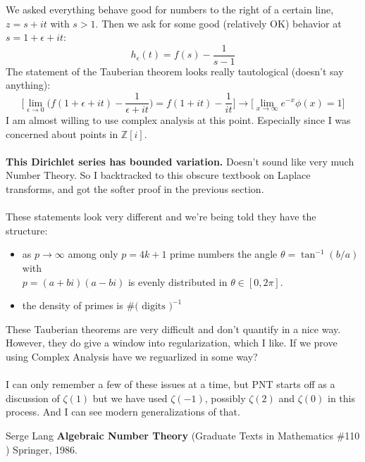 \documentclass[12pt]{article}
\begin{document}
\noindent We asked everything behave good for numbers to the right of a certain line, $z = s + it $ with $s > 1$.  Then we ask for some good (relatively OK)  behavior at $s = 1+\epsilon + it $:
$$ h_\epsilon(t) = f(s) - \frac{1}{s-1}  $$
The statement of the Tauberian theorem looks really tautological (doesn't say anything):
$$ \Bigg[ \lim_{\epsilon \to 0} \Big( f(1 + \epsilon + it) - \frac{1}{\epsilon + it}\Big) = f(1 + it) - \frac{1}{ it}  \Bigg] \to \Bigg[ \lim_{x \to \infty } e^{-x} \phi (x) = 1 \Bigg] $$
I am almost willing to use complex analysis at this point.  Especially since I was concerned about points in $\mathbb{Z}[i]$. \\ \\
\textbf{This Dirichlet series has bounded variation.} Doesn't sound like very much Number Theory. So I backtracked to this obscure textbook on Laplace transforms, and got the softer proof in the previous section. \\ \\
These statements look very different and we're being told they have the structure:
\begin{itemize}
\item as $p \to \infty$ among only $p = 4k+1$ prime numbers the angle $\theta = \tan^{-1}(b/a)$  with \\ $p = (a+bi)(a-bi) $ is evenly distributed in $\theta \in [0, 2\pi]$.
\item the density of primes is $\# \text{( digits )}^{-1}$
\end{itemize}
These Tauberian theorems are very difficult and don't quantify in a nice way. However, they do give a window into regularization, which I like.  If we prove using Complex Analysis have we reguarlized in some way? \\ \\
I can only remember a few of these issues at a time, but PNT starts off as a discussion of $\zeta(1)$ but we have used $\zeta(-1)$, possibly $\zeta(2)$ and $\zeta(0)$ in this process.  And I can see modern generalizations of that.
 
\vfill

\selectfont \fontsize{12}{15}\selectfont

\begin{thebibliography}{}

\item Serge Lang \textbf{Algebraic Number Theory} (Graduate Texts in Mathematics \#110 )  Springer, 1986.

\end{thebibliography}
\end{document}
